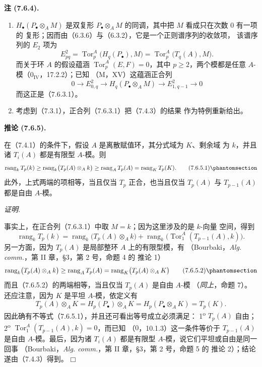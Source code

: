 \documentclass[UTF8,fontset=none,11pt,oneside,openany]{ctexbook}
\providecommand{\square}{\mdlgwhtsquare}
\newenvironment{corollary}[1][]{%
  \par\medskip\noindent\textbf{推论 (#1).}\ %
}{\par}
\newenvironment{remarks}[1][]{%
  \par\medskip\noindent\textbf{注 (#1).}\ %
}{\par}
\newenvironment{proof}{%
  \par\smallskip\noindent\textit{证明.}\ %
}{\hfill$\square$\par}
\newcommand{\oldpage}[2][]{%
  \hypertarget{ega-source-page-#1-#2}{}%
  \marginnote{\scriptsize\textbf{#1}~|~#2}\ignorespaces}
\let\EGAOriginalLabel\label
\renewcommand{\label}[1]{\phantomsection\EGAOriginalLabel{#1}}
\begin{document}
\begin{remarks}[7.6.4]
\begin{enumerate}
  \item[(i)] $H_\bullet(P_\bullet\otimes_A M)$ 是双复形
    $P_\bullet\otimes_A M$ 的同调，其中把 $M$ 看成只在次数 0 有一项的
    复形；因而由（6.3.6）与（6.3.2），它是一个正则谱序列的收敛项，
    该谱序列的 $E_2$ 项为
    \[
      E^2_{pq}
      =
      \operatorname{Tor}_p^A\bigl(H_q(P_\bullet),M\bigr)
      =
      \operatorname{Tor}_p^A\bigl(T_q(A),M\bigr).
    \]
    \oldpage[III]{194}
    而关于环 $A$ 的假设蕴涵 $\operatorname{Tor}_p^A(E,F)=0$，其中
    $p\geq2$，两个模都是任意 $A$-模（$0_{\mathrm{IV}}$，17.2.2）；已知
    （M，XV）这蕴涵正合列
    \[
      0\longrightarrow E^2_{0,q}
      \longrightarrow H_q(P_\bullet\otimes_A M)
      \longrightarrow E^2_{1,q-1}
      \longrightarrow0
    \]
    而这正是（7.6.3.1）。
  \item[(ii)] 考虑到（7.3.1），正合列（7.6.3.1）把（7.4.3）的结果
    作为特例重新给出。
\end{enumerate}
\end{remarks}

\begin{corollary}[7.6.5]
在（7.4.1）的条件下，假设 $A$ 是离散赋值环，其分式域为 $K$、剩余域
为 $k$，并且诸 $T_i(A)$ 都是有限型 $A$-模。则
\[
  \operatorname{rang}_k T_p(k)
  \geq
  \operatorname{rang}_k\bigl(T_p(A)\otimes_A k\bigr)
  \geq
  \operatorname{rang}_A T_p(A)
  =
  \operatorname{rang}_K T_p(K).
  \tag{7.6.5.1}\label{III.7.6.5.1.fr}
\]
此外，上式两端的项相等，当且仅当 $T_p$ 正合，也当且仅当 $T_p(A)$ 与
$T_{p-1}(A)$ 都是自由 $A$-模。
\end{corollary}

\begin{proof}
事实上，在正合列（7.6.3.1）中取 $M=k$；因为这里涉及的是 $k$-向量
空间，得到
\[
  \operatorname{rang}_k T_p(k)
  =
  \operatorname{rang}_k\bigl(T_p(A)\otimes_A k\bigr)
  +
  \operatorname{rang}_k\bigl(\operatorname{Tor}_1^A(T_{p-1}(A),k)\bigr).
\]
另一方面，因为 $T_p(A)$ 是局部整环 $A$ 上的有限型模，有
（Bourbaki，\emph{Alg. comm.}，第 II 章，\S 3，第 2 号，命题 4 的
推论 1）
\[
  \operatorname{rang}_k\bigl(T_p(A)\otimes_A k\bigr)
  \geq
  \operatorname{rang}_A T_p(A)
  =
  \operatorname{rang}_K\bigl(T_p(A)\otimes_A K\bigr)
  \tag{7.6.5.2}\label{III.7.6.5.2.fr}
\]
而且（7.6.5.2）的两端相等，当且仅当 $T_p(A)$ 是自由 $A$-模
（\emph{同上}，命题 7）。还应注意，因为 $K$ 是平坦 $A$-模，依定义有
\[
  T_p(A)\otimes_A K
  =
  H_p(P_\bullet)\otimes_A K
  =
  H_p(P_\bullet\otimes_A K)
  =
  T_p(K).
\]
因此确有不等式（7.6.5.1），并且还可看出等号成立必须满足：
1\textsuperscript{o} $T_p(A)$ 自由；
2\textsuperscript{o} $\operatorname{Tor}_1^A(T_{p-1}(A),k)=0$，而已知
（$0$，10.1.3）这一条件等价于 $T_{p-1}(A)$ 是自由 $A$-模。最后，因为诸
$T_i(A)$ 都是有限型 $A$-模，说它们平坦或自由是同一回事
（Bourbaki，\emph{Alg. comm.}，第 II 章，\S 3，第 2 号，命题 5 的
推论 2）；结论遂由（7.4.3）得到。
\end{proof}
\end{document}
